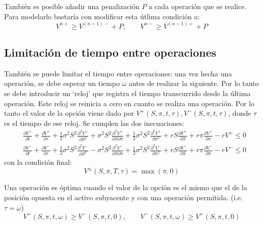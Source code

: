 También es posible añadir una penalización $P$ a cada operación que se realice. Para modelarlo bastaría con modificar esta útlima condición a:
\begin{equation*}
    \boxed{V^{n+} \geq V^{(n-1)-} + P, \qquad V^{n-} \geq V^{(n-1)+} + P}
\end{equation*}






\subsection{Limitación de tiempo entre operaciones}
También se puede limitar el tiempo entre operaciones: una vez hecha una operación, se debe esperar un tiempo $\omega$ antes de realizar la siguiente. Por lo tanto se debe introducir un `reloj' que registra el tiempo transcurrido desde la última operación. Este reloj se reinicia a cero en cuanto se realiza una operación. Por lo tanto el valor de la opción viene dado por $V^{+}(S,\pi,t,\tau), V^{-}(S,\pi,t,\tau)$, donde $\tau$ es el tiempo de ese reloj. Se cumplen las dos inecuaciones:
\begin{align*}
    &\boxed{\frac{\partial V^{+}}{\partial t} + \frac{\partial V^{+}}{\partial \tau} + \frac{1}{2}\sigma^2 S^2 \frac{\partial^2 V^{+}}{\partial S^2} + \sigma^2 S^2 \frac{\partial^2 V^{+}}{\partial S \partial \pi} + \frac{1}{2}\sigma^2 S^2 \frac{\partial^2 V^{+}}{\partial \pi^2} + rS\frac{\partial V^{+}}{\partial S} + r\pi\frac{\partial V^{+}}{\partial \pi} - rV^{+} \leq 0} \\[1.5em]
    &\boxed{\frac{\partial V^{-}}{\partial t} + \frac{\partial V^{-}}{\partial \tau} + \frac{1}{2}\sigma^2 S^2 \frac{\partial^2 V^{-}}{\partial S^2} - \sigma^2 S^2 \frac{\partial^2 V^{-}}{\partial S \partial \pi} + \frac{1}{2}\sigma^2 S^2 \frac{\partial^2 V^{-}}{\partial \pi^2} + rS\frac{\partial V^{-}}{\partial S} + r\pi\frac{\partial V^{-}}{\partial \pi} - rV^{-} \leq 0}
\end{align*}
con la condición final:
\begin{equation*}
    \boxed{V^{\pm}(S,\pi,T,\tau) = \max(\pi,0)}
\end{equation*}

Una operación es óptima cuando el valor de la opción es el mismo que el de la posición opuesta en el activo subyacente y con una operación permitida. (i.e.\ $\tau=\omega$)
\begin{equation*}
    \boxed{V^{+}(S,\pi,t,\omega) \geq V^{-}(S,\pi,t,0), \qquad V^{-}(S,\pi,t,\omega) \geq V^{+}(S,\pi,t,0)}
\end{equation*}








